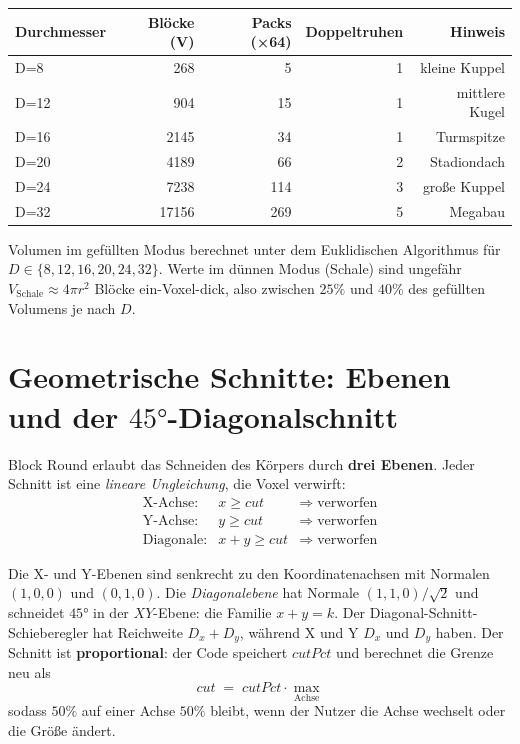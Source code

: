 \documentclass[12pt,a4paper]{scrartcl}
\newcommand{\acc}[1]{\textcolor{accent}{\textbf{#1}}}
\begin{document}
\vspace{0.5em}
\begin{center}
\begin{tabular}{@{}lrrrr@{}}
\toprule
\textbf{Durchmesser} & \textbf{Blöcke (V)} & \textbf{Packs (×64)} & \textbf{Doppeltruhen} & \textbf{Hinweis} \\
\midrule
D=8   &   268 &  5  & 1 & kleine Kuppel  \\
D=12  &   904 & 15  & 1 & mittlere Kugel \\
D=16  &  2145 & 34  & 1 & Turmspitze \\
D=20  &  4189 & 66  & 2 & Stadiondach \\
D=24  &  7238 & 114 & 3 & große Kuppel \\
D=32  & 17156 & 269 & 5 & Megabau \\
\bottomrule
\end{tabular}
\end{center}

Volumen im gefüllten Modus berechnet unter dem Euklidischen Algorithmus für $D \in \{8,12,16,20,24,32\}$. Werte im dünnen Modus (Schale) sind ungefähr $V_{\mathrm{Schale}} \approx 4\pi r^2$ Blöcke ein-Voxel-dick, also zwischen $25\%$ und $40\%$ des gefüllten Volumens je nach $D$.

\section{Geometrische Schnitte: Ebenen und der $45°$-Diagonalschnitt}

Block Round erlaubt das Schneiden des Körpers durch \acc{drei Ebenen}. Jeder Schnitt ist eine \emph{lineare Ungleichung}, die Voxel verwirft:
\[
\begin{array}{lcl}
\text{X-Achse:}    & x \geq \mathit{cut}      & \Rightarrow\; \text{verworfen} \\
\text{Y-Achse:}    & y \geq \mathit{cut}      & \Rightarrow\; \text{verworfen} \\
\text{Diagonale:}  & x + y \geq \mathit{cut}  & \Rightarrow\; \text{verworfen}
\end{array}
\]

Die X- und Y-Ebenen sind senkrecht zu den Koordinatenachsen mit Normalen $(1,0,0)$ und $(0,1,0)$. Die \emph{Diagonalebene} hat Normale $(1,1,0)/\sqrt{2}$ und schneidet $45°$ in der $XY$-Ebene: die Familie $x+y = k$. Der Diagonal-Schnitt-Schieberegler hat Reichweite $D_x + D_y$, während X und Y $D_x$ und $D_y$ haben. Der Schnitt ist \acc{proportional}: der Code speichert $\mathit{cutPct}$ und berechnet die Grenze neu als
\[
\mathit{cut} \;=\; \mathit{cutPct} \cdot \max_{\text{Achse}}
\]
sodass $50\%$ auf einer Achse $50\%$ bleibt, wenn der Nutzer die Achse wechselt oder die Größe ändert.
\end{document}
